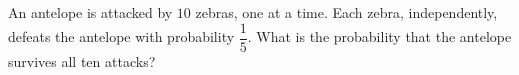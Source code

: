 An antelope is attacked by $10$ zebras, one at a time. Each zebra, independently, defeats the antelope with probability $\dfrac{1}{5}$. What is the probability that the antelope survives all ten attacks?

